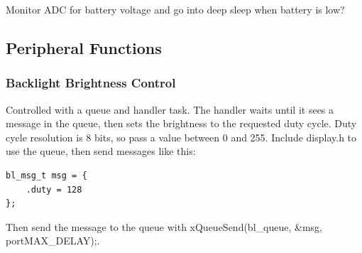 \documentclass{article}
\begin{document}
Monitor ADC for battery voltage and go into deep sleep when battery is low?

\subsection{Peripheral Functions}

\subsubsection{Backlight Brightness Control}

Controlled with a queue and handler task. The handler waits until it sees a message in the queue, then sets the brightness to the requested duty cycle.
Duty cycle resolution is 8 bits, so pass a value between 0 and 255. Include display.h to use the queue, then send messages like this:
\begin{verbatim}
bl_msg_t msg = {
    .duty = 128
};

\end{verbatim}
Then send the message to the queue with xQueueSend(bl\_queue, \&msg, portMAX\_DELAY);.
\end{document}
